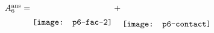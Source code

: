 \documentclass{standalone}
\begin{document}
$
 A_6^{\text{ans}}=\raisebox{-6mm}{\texttt{[image: p6-fac-2]}}+\raisebox{-6.8mm}{\texttt{[image: p6-contact]}}
$
\end{document}
